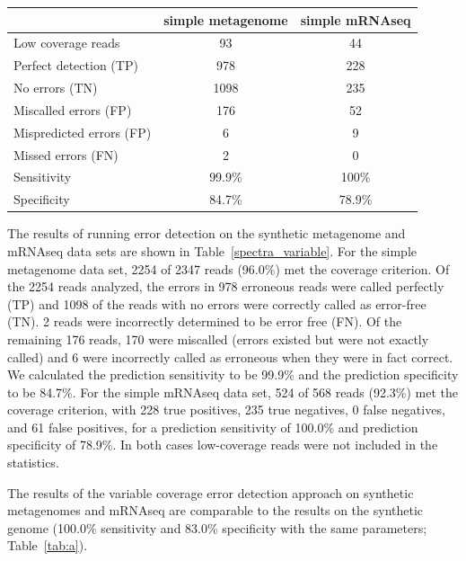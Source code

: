 \documentclass{article}
\begin{document}

\begin{table}
\begin{tabular}{|l|c||c|}
\hline
& simple metagenome & simple mRNAseq \\
\hline
Low coverage reads & 93 & 44 \\
\hline
Perfect detection (TP) & 978 & 228 \\
No errors (TN) & 1098 & 235 \\
Miscalled errors (FP) & 176 & 52 \\
Mispredicted errors (FP) & 6 & 9 \\
Missed errors (FN) & 2 & 0 \\
\hline
Sensitivity & 99.9\% & 100\% \\
Specificity & 84.7\% & 78.9\% \\
\hline
\end{tabular}
\label{tab:spectra_variable}
\end{table}

The results of running error detection on the synthetic metagenome and
mRNAseq data sets are shown in Table~\ref{spectra_variable}. For the
simple metagenome data set, 2254 of 2347 reads (96.0\%) met the
coverage criterion.  Of the 2254 reads analyzed, the errors in 978
erroneous reads were called perfectly (TP) and 1098 of the reads with
no errors were correctly called as error-free (TN).  2 reads were
incorrectly determined to be error free (FN).  Of the remaining 176
reads, 170 were miscalled (errors existed but were not exactly called)
and 6 were incorrectly called as erroneous when they were in fact
correct.  We calculated the prediction sensitivity to be 99.9\% and
the prediction specificity to be 84.7\%.  For the simple mRNAseq data
set, 524 of 568 reads (92.3\%) met the coverage criterion, with 228
true positives, 235 true negatives, 0 false negatives, and 61 false
positives, for a prediction sensitivity of 100.0\% and prediction
specificity of 78.9\%.  In both cases low-coverage reads were not
included in the statistics.

The results of the variable coverage error detection approach on
synthetic metagenomes and mRNAseq are comparable to the results
on the synthetic genome (100.0\% sensitivity and 83.0\%
specificity with the same parameters; Table~\ref{tab:a}).

\end{document}

